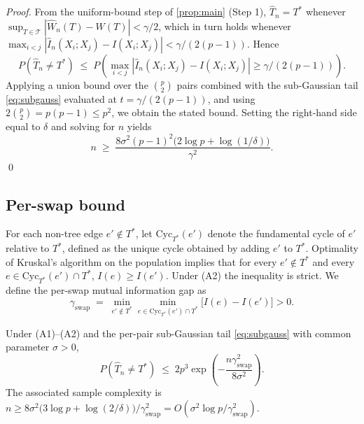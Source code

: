 \emph{Proof.} From the uniform-bound step of \cref{prop:main} (Step
1), $\hat{T}_n = T^*$ whenever
$\sup_{T \in \mathcal{T}} |\hat{W}_n(T) - W(T)| < \gamma / 2$, which
in turn holds whenever
$\max_{i < j} |\hat{I}_n(X_i; X_j) - I(X_i; X_j)| < \gamma / (2(p-1))$.
Hence
\[
P(\hat{T}_n \ne T^*) \;\le\;
P\!\left(\max_{i < j}|\hat{I}_n(X_i; X_j) - I(X_i; X_j)| \ge
\gamma / (2(p-1))\right).
\]
Applying a union bound over the $\binom{p}{2}$ pairs combined with
the sub-Gaussian tail \eqref{eq:subgauss} evaluated at
$t = \gamma / (2(p-1))$, and using
$2 \binom{p}{2} = p(p-1) \le p^2$, we obtain the stated bound.
Setting the right-hand side equal to $\delta$ and solving for $n$
yields
\begin{equation*}
n \;\ge\; \frac{8 \sigma^2 (p-1)^2 \bigl(2 \log p + \log(1/\delta)\bigr)}{\gamma^2}.
\end{equation*}
\qed

\subsection{Per-swap bound}
\label{app:cor2}

For each non-tree edge $e' \notin T^*$, let
$\mathrm{Cyc}_{T^*}(e')$ denote the fundamental cycle of $e'$ relative
to $T^*$, defined as the unique cycle obtained by adding $e'$ to
$T^*$. Optimality of Kruskal's algorithm on the population implies
that for every $e' \notin T^*$ and every
$e \in \mathrm{Cyc}_{T^*}(e') \cap T^*$, $I(e) \ge I(e')$. Under (A2)
the inequality is strict. We define the per-swap mutual information
gap as
\begin{equation}
\gamma_{\mathrm{swap}} \;=\; \min_{e' \notin T^*}
\min_{e \in \mathrm{Cyc}_{T^*}(e') \cap T^*} \bigl[I(e) - I(e')\bigr] > 0.
\label{eq:gamma_swap}
\end{equation}

\begin{corollary}
\label{cor:swap}
Under (A1)--(A2) and the per-pair sub-Gaussian tail
\eqref{eq:subgauss} with common parameter $\sigma > 0$,
\begin{equation}
P(\hat{T}_n \ne T^*) \;\le\; 2 p^3 \exp\!\left(-\frac{n
\gamma_{\mathrm{swap}}^2}{8 \sigma^2}\right).
\end{equation}
The associated sample complexity is
$n \ge 8 \sigma^2 \bigl(3 \log p + \log(2/\delta)\bigr) /
\gamma_{\mathrm{swap}}^2 = O(\sigma^2 \log p /
\gamma_{\mathrm{swap}}^2)$.
\end{corollary}

